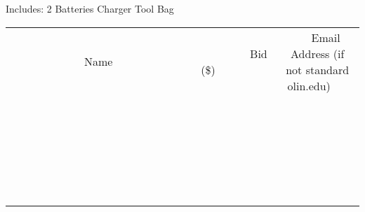 \documentclass[11pt]{article}
\begin{document}
Includes:
2 Batteries
Charger
Tool Bag
\\[6ex]
\begin{tabular}{c c c}
~~~~~~~~~~~~~Name~~~~~~~~~~~~~ & ~~~~~~~~~Bid (\$)~~~~~~~~~  & ~~~Email Address (if not standard olin.edu)~~~\\
 & & \\
\hline
 & & \\
\hline
 & & \\
\hline
 & & \\
\hline
 & & \\
\hline
 & & \\
\hline
 & & \\
\hline
 & & \\
\hline
 & & \\
\hline
 & & \\
\hline
 & & \\
\hline
 & & \\
\hline
 & & \\
\hline
 & & \\
\hline
 & & \\
\hline
 & & \\
\hline
 & & \\
\hline
 & & \\
\hline
 & & \\
\hline
 & & \\
\hline
 & & \\
\hline
 & & \\
\hline
 & & \\
\hline
 & & \\
\hline
 & & \\
\hline
 & & \\
\hline
\end{tabular}
\newpage
\end{document}
